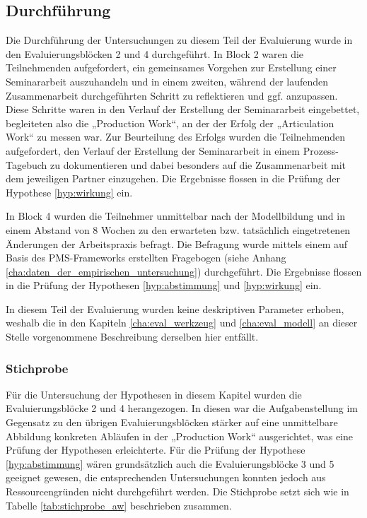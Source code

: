 
\subsection{Durchführung} %
\label{sub:a_durchführung}

Die Durchführung der Untersuchungen zu diesem Teil der Evaluierung wurde in den Evaluierungsblöcken 2 und 4 durchgeführt. In Block 2 waren die Teilnehmenden aufgefordert, ein gemeinsames Vorgehen zur Erstellung einer Seminararbeit auszuhandeln und in einem zweiten, während der laufenden Zusammenarbeit durchgeführten Schritt zu reflektieren und ggf. anzupassen. Diese Schritte waren in den Verlauf der Erstellung der Seminararbeit eingebettet, begleiteten also die „Production Work“, an der der Erfolg der „Articulation Work“ zu messen war. Zur Beurteilung des Erfolgs wurden die Teilnehmenden aufgefordert, den Verlauf der Erstellung der Seminararbeit in einem Prozess-Tagebuch zu dokumentieren und dabei besonders auf die Zusammenarbeit mit dem jeweiligen Partner einzugehen. Die Ergebnisse flossen in die Prüfung der Hypothese \ref{hyp:wirkung} ein.

In Block 4 wurden die Teilnehmer unmittelbar nach der Modellbildung und in einem Abstand von 8 Wochen zu den erwarteten bzw. tatsächlich eingetretenen Änderungen der Arbeitspraxis befragt. Die Befragung wurde mittels einem auf Basis des \gls{PMS}-Frameworks erstellten Fragebogen (siehe Anhang \ref{cha:daten_der_empirischen_untersuchung}) durchgeführt. Die Ergebnisse flossen in die Prüfung der Hypothesen \ref{hyp:abstimmung} und \ref{hyp:wirkung} ein.

In diesem Teil der Evaluierung wurden keine deskriptiven Parameter erhoben, weshalb die in den Kapiteln \ref{cha:eval_werkzeug} und \ref{cha:eval_modell} an dieser Stelle vorgenommene Beschreibung derselben hier entfällt.

\subsubsection{Stichprobe} %

Für die Untersuchung der Hypothesen in diesem Kapitel wurden die Evaluierungsblöcke 2 und 4 herangezogen.  In diesen war die Aufgabenstellung im Gegensatz zu den übrigen Evaluierungsblöcken stärker auf eine unmittelbare Abbildung konkreten Abläufen in der „Production Work“ ausgerichtet, was eine Prüfung der Hypothesen erleichterte. Für die Prüfung der Hypothese \ref{hyp:abstimmung} wären grundsätzlich auch die Evaluierungsblöcke 3 und 5 geeignet gewesen, die entsprechenden Untersuchungen konnten jedoch aus Ressourcengründen nicht durchgeführt werden. Die Stichprobe setzt sich wie in Tabelle \ref{tab:stichprobe_aw} beschrieben zusammen.

